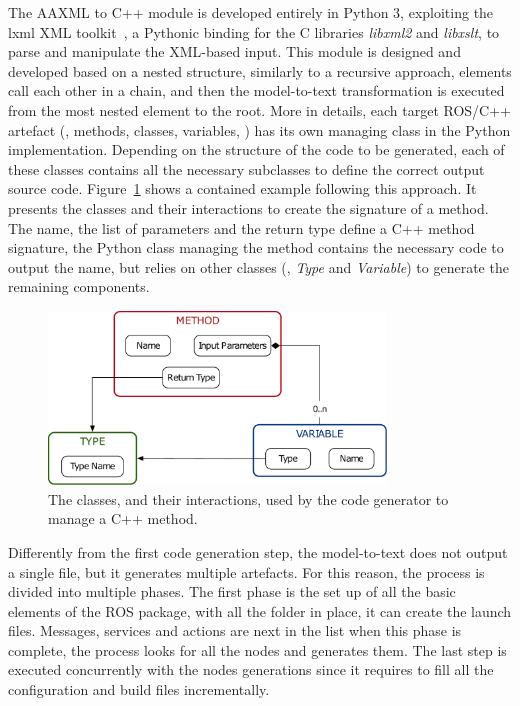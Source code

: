 The AAXML to C++ module is developed entirely in Python 3, exploiting the lxml XML toolkit~\cite{lxml}, a Pythonic binding for the C libraries \textit{libxml2} and \textit{libxslt}, to parse and manipulate the XML-based input. This module is designed and developed based on a nested structure, similarly to a recursive approach, elements call each other in a chain, and then the model-to-text transformation is executed from the most nested element to the root. More in details, each target ROS/C++ artefact (\eg, methods, classes, variables, \etc) has its own managing class in the Python implementation. Depending on the structure of the code to be generated, each of these classes contains all the necessary subclasses to define the correct output source code. Figure~\ref{fig:russiandoll} shows a contained example following this approach. It presents the classes and their interactions to create the signature of a method.  The name, the list of parameters and the return type define a C++ method signature, the Python class managing the method contains the necessary code to output the name, but relies on other classes (\ie, \textit{Type} and \textit{Variable}) to generate the remaining components.

\begin{figure}[t]
    \centering
    \includegraphics[width=0.8\textwidth]{gfx/russiandoll}
    \caption{The classes, and their interactions, used by the code generator to manage a C++ method.}\label{fig:russiandoll}
\end{figure}

Differently from the first code generation step, the model-to-text does not output a single file, but it generates multiple artefacts. For this reason, the process is divided into multiple phases. The first phase is the set up of all the basic elements of the ROS package, with all the folder in place, it can create the launch files. Messages, services and actions are next in the list when this phase is complete, the process looks for all the nodes and generates them. The last step is executed concurrently with the nodes generations since it requires to fill all the configuration and build files incrementally.

